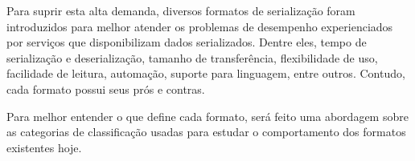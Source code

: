 Para suprir esta alta demanda, diversos formatos de serialização foram introduzidos para melhor atender os problemas de desempenho experienciados por serviços que disponibilizam dados serializados. Dentre eles, tempo de serialização e deserialização, tamanho de transferência, flexibilidade de uso, facilidade de leitura, automação, suporte para linguagem, entre outros. Contudo, cada formato possui seus prós e contras. \cite{Guller2016}

\begin{table}[ht!]
  \centering
  \caption{Comparação de formatos de serialização}
\end{table}

Para melhor entender o que define cada formato, será feito uma abordagem sobre as categorias de classificação usadas para estudar o comportamento dos formatos existentes hoje.





